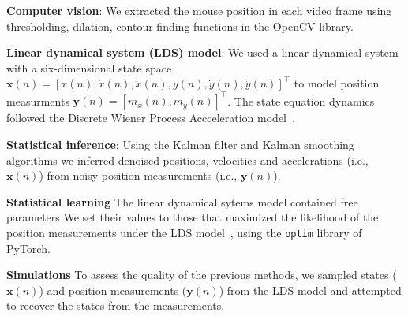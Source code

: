 
\noindent\textbf{Computer vision}: 
%
We extracted the mouse position in each video frame using thresholding,
dilation, contour finding functions in the OpenCV library.

\noindent\textbf{Linear dynamical system (LDS) model}:
%
We used a linear dynamical system with a six-dimensional state space
$\mathbf{x}(n)=[x(n), \dot{x}(n), \ddot{x}(n), y(n), \dot{y}(n),
\ddot{y}(n)]^\intercal$ to model position measurments $\mathbf{y}(n)=[m_x(n),
m_y(n)]^\intercal$.  The state equation dynamics followed the Discrete Wiener
Process Accceleration model~\cite{c1}.

\noindent\textbf{Statistical inference}:
%
Using the Kalman filter and Kalman smoothing algorithms\cite{c2} we
inferred denoised positions, velocities and accelerations (i.e., $\mathbf{x}(n)$)
from noisy position measurements (i.e., $\mathbf{y}(n)$).

\noindent\textbf{Statistical learning}
%
The linear dynamical sytems model contained free parameters We set their values
to those that maximized the likelihood of the position measurements under the
LDS model~\cite{c2}, using the \texttt{optim} library of PyTorch.

\noindent\textbf{Simulations}
%
To assess the quality of the previous methods, we sampled states
($\mathbf{x}(n)$) and position measurements ($\mathbf{y}(n)$) from the LDS
model and attempted to recover the states from the measurements.
